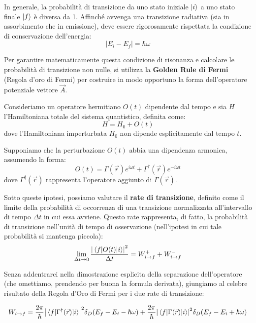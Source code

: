 In generale, la probabilità di transizione da uno stato iniziale \(\ket{i}\) a uno stato finale \(\ket{f}\) è diversa da 1. Affinché avvenga una transizione radiativa (sia in assorbimento che in emissione), deve essere rigorosamente rispettata la condizione di conservazione dell'energia:
\begin{equation}
    |E_i - E_f| = \hbar\omega
\end{equation}

Per garantire matematicamente questa condizione di risonanza e calcolare le probabilità di transizione non nulle, si utilizza la \textbf{Golden Rule di Fermi} (Regola d'oro di Fermi) per costruire in modo opportuno la forma dell'operatore potenziale vettore \(\vec{A}\).

Consideriamo un operatore hermitiano \( O(t) \) dipendente dal tempo e sia \( H \) l'Hamiltoniana totale del sistema quantistico, definita come:
\begin{equation}
    H = H_0 + O(t)
\end{equation}
dove l'Hamiltoniana imperturbata \( H_0 \) non dipende esplicitamente dal tempo \( t \).

Supponiamo che la perturbazione \( O(t) \) abbia una dipendenza armonica, assumendo la forma:
\begin{equation}
    O(t) = \Gamma(\vec{r})e^{i\omega t} + \Gamma^\dagger(\vec{r})e^{-i\omega t}
\end{equation}
dove \( \Gamma^\dagger(\vec{r}) \) rappresenta l'operatore aggiunto di \( \Gamma(\vec{r}) \).

Sotto queste ipotesi, possiamo valutare il \textbf{rate di transizione}, definito come il limite della probabilità di occorrenza di una transizione normalizzata all'intervallo di tempo \( \Delta t \) in cui essa avviene. Questo rate rappresenta, di fatto, la probabilità di transizione nell'unità di tempo di osservazione (nell'ipotesi in cui tale probabilità si mantenga piccola):
\begin{equation}
    \lim_{\Delta t \to 0} \frac{\abs{\mel{f}{O(t)}{i}}^2}{\Delta t} = W_{i \to f}^+ + W_{i \to f}^-
\end{equation}

Senza addentrarci nella dimostrazione esplicita della separazione dell'operatore (che omettiamo, prendendo per buona la formula derivata), giungiamo al celebre risultato della Regola d'Oro di Fermi per i due rate di transizione:

\begin{importantbox}
    \begin{equation}
        W_{i \to f} = \frac{2\pi}{\hbar} \abs{\mel{f}{\Gamma^\dagger(\vec{r})}{i}}^2 \delta_D(E_f - E_i - \hbar\omega) + \frac{2\pi}{\hbar} \abs{\mel{f}{\Gamma(\vec{r})}{i}}^2 \delta_D(E_f - E_i + \hbar\omega)
    \end{equation}
\end{importantbox}


